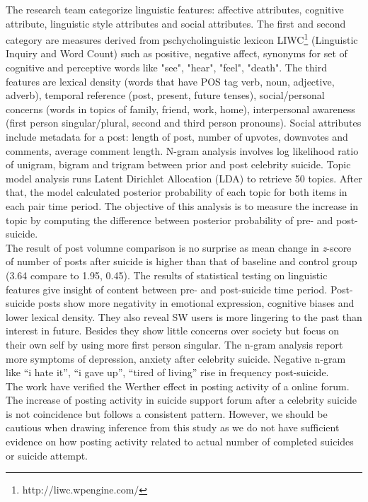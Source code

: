 The research team categorize linguistic features: affective attributes, cognitive attribute, linguistic style attributes and social attributes. The first and second category are measures derived from pschycholinguistic lexicon LIWC\footnote{http://liwc.wpengine.com/} (Linguistic Inquiry and Word Count) such as positive, negative affect, synonyms for set of cognitive and perceptive words like "see", "hear", "feel", "death". The third features are lexical density (words that have POS tag verb, noun, adjective, adverb), temporal reference (post, present, future tenses), social/personal concerns (words in topics of family, friend, work, home), interpersonal awareness (first person singular/plural, second and third person pronouns). Social attributes include metadata for a post: length of post, number of upvotes, downvotes and comments, average comment length. N-gram analysis involves log likelihood ratio of unigram, bigram and trigram between prior and post celebrity suicide. Topic model analysis runs Latent Dirichlet Allocation (LDA) \cite{Blei2003} to retrieve 50 topics. After that, the model calculated posterior probability of each topic for both items in each pair time period. The objective of this analysis is to measure the increase in topic by computing the difference between posterior probability of pre- and post-suicide.\\
The result of post volumne comparison is no surprise as mean change in \textit{z}-score of number of posts after suicide is higher than that of baseline and control group (3.64 compare to 1.95, 0.45). The results of statistical testing on linguistic features give insight of content between pre- and post-suicide time period. Post-suicide posts show more negativity in emotional expression, cognitive biases and lower lexical density. They also reveal SW users is more lingering to the past than interest in future. Besides they show little concerns over society but focus on their own self by using more first person singular. The n-gram analysis report more symptoms of depression, anxiety after celebrity suicide. Negative n-gram like “i hate it”, “i gave up”, “tired of living” rise in frequency post-suicide. \\
The work have verified the Werther effect in posting activity of a online forum. The increase of posting activity in suicide support forum after a celebrity suicide is not coincidence but follows a consistent pattern. However, we should be cautious when drawing inference from this study as we do not have sufficient evidence on how posting activity related to actual number of completed suicides or suicide attempt.\\

